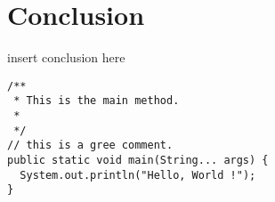
\chapter{Conclusion}

insert conclusion here

\begin{lstlisting}
/**
 * This is the main method.
 *
 */
// this is a gree comment.
public static void main(String... args) {
  System.out.println("Hello, World !");
}
\end{lstlisting}